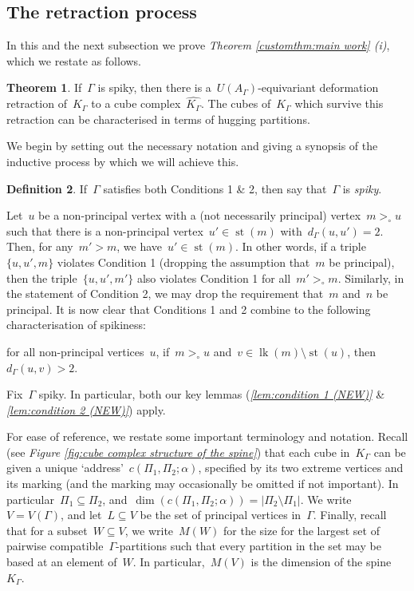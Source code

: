 \documentclass[11pt]{amsart}
\theoremstyle{definition}
\theoremstyle{definition}
\theoremstyle{definition}
\theoremstyle{definition}
\newtheorem{theorem}{Theorem}[section]
\newtheorem{definition}[theorem]{Definition}
\newcommand{\uag}{U(A_{\Gamma})} %
\newcommand{\link}[1]{\operatorname{lk}({#1})} %
\newcommand{\str}[1]{\operatorname{st}({#1})} %
\newcommand{\spine}{K_{\Gamma}} %
\newcommand{\res}{\widehat{K_\Gamma}} %
\begin{document}
\subsection{The retraction process}\label{subsec:retraction process}

In this and the next subsection we prove \textit{Theorem \ref{customthm:main work} (i)}, which we restate as follows.

\begin{theorem}\label{thm:retraction process (D,(i))}
    If~$\Gamma$ is spiky, then there is a~$\uag$-equivariant deformation retraction of~$\spine$ to a cube complex~$\res$. The cubes of~$\spine$ which survive this retraction can be characterised in terms of hugging partitions. 
\end{theorem}

We begin by setting out the necessary notation and giving a synopsis of the inductive process by which we will achieve this.

\begin{definition}\label{def:spiky}
    If~$\Gamma$ satisfies both Conditions 1 \& 2, then say that~$\Gamma$ is \emph{spiky}.
\end{definition}

Let~$u$ be a non-principal vertex with a (not necessarily principal) vertex~$m >_\circ u$ such that there is a non-principal vertex~$u' \in \str{m}$ with~$d_\Gamma(u, u') = 2$. Then, for any~$m' > m$, we have~$u' \in \str{m}$. In other words, if a triple~$\{u, u', m\}$ violates Condition 1 (dropping the assumption that~$m$ be principal), then the triple~$\{u, u', m'\}$ also violates Condition 1 for all~$m' >_\circ m$. Similarly, in the statement of Condition 2, we may drop the requirement that~$m$ and~$n$ be principal. It is now clear that Conditions 1 and 2 combine to the following characterisation of spikiness:
\begin{center}
    for all non-principal vertices~$u$, if~$m >_\circ u$ and~$v \in \link{m} \setminus \str{u}$, then~$d_\Gamma(u, v) > 2$.
\end{center}

Fix~$\Gamma$ spiky. In particular, both our key lemmas (\textit{\ref{lem:condition 1 (NEW)}} \& \textit{\ref{lem:condition 2 (NEW)}}) apply.

For ease of reference, we restate some important terminology and notation. Recall (see \textit{Figure \ref{fig:cube complex structure of the spine}}) that each cube in~$\spine$ can be given a unique `address'~$c(\Pi_1, \Pi_2; \alpha)$, specified by its two extreme vertices and its marking (and the marking may occasionally be omitted if not important). In particular~$\Pi_1 \subseteq \Pi_2$, and~$\dim(c(\Pi_1, \Pi_2; \alpha)) = \vert \Pi_2 \setminus \Pi_1 \vert$. We write~$V = V(\Gamma)$, and let~$L \subseteq V$ be the set of principal vertices in~$\Gamma$. Finally, recall that for a subset~$W \subseteq V$, we write~$M(W)$ for the size for the largest set of pairwise compatible~$\Gamma$-partitions such that every partition in the set may be based at an element of~$W$. In particular,~$M(V)$ is the dimension of the spine~$\spine$.
\end{document}
